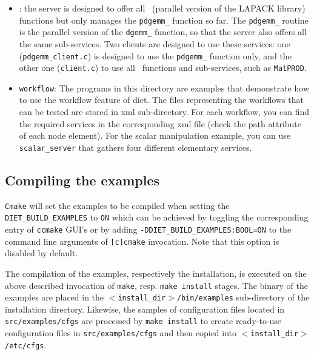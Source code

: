 \begin{itemize}
\item{\texttt{\scalapack}}: the server is designed to offer all
  \scalapack\  (parallel version of the LAPACK library) functions but
  only manages the \texttt{pdgemm\_} function so far. The
  \texttt{pdgemm\_} routine is the parallel version of the
  \texttt{dgemm\_} function, so that the server also offers all the
  same sub-services. Two clients are designed to use these services:
  one (\texttt{pdgemm\_client.c}) is designed to use the
  \texttt{pdgemm\_} function only, and the other one
  (\texttt{client.c}) to use all \scalapack\ functions and
  sub-services, such as \texttt{MatPROD}.

\item{\texttt{workflow}}: The programs in this directory are examples
  that demonstrate how to use the workflow feature of diet.  The files
  representing the workflows that can be tested are stored in xml
  sub-directory. For each workflow, you can find the required services
  in the corresponding xml file (check the path attribute of each node
  element).  For the scalar manipulation example, you can use
  \texttt{scalar\_server} that gathers four different elementary
  services.
\end{itemize}

\subsection{Compiling the examples}
\label{subsection:compiling-examples}

\verb+Cmake+ will set the examples to be compiled when setting the
\verb+DIET_BUILD_EXAMPLES+ to \verb+ON+ which can be achieved by
toggling the corresponding entry of \verb+ccmake+ GUI's or by adding
\verb+-DDIET_BUILD_EXAMPLES:BOOL=ON+ to the command line arguments of
\verb+[c]cmake+ invocation. Note that this option is disabled by
default.

The compilation of the examples, respectively the installation, is
executed on the above described invocation of \verb+make+, resp.
\verb+make install+ stages. The binary of the examples are placed in
the  \texttt{$<$install\_dir$>$/bin/examples} sub-directory of the
installation directory.  Likewise, the samples of configuration files
located in \texttt{src/examples/cfgs} are processed by \texttt{make
  install} to create ready-to-use configuration files in
\texttt{src/examples/cfgs} and then copied into
\texttt{$<$install\_dir$>$/etc/cfgs}.

